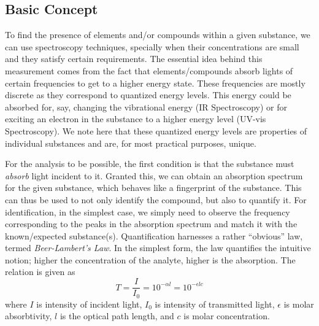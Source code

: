 \subsection {Basic Concept}
To find the presence of elements and/or compounds within a given substance, we can use spectroscopy techniques, specially when their concentrations are small and they satisfy certain requirements. The essential idea behind this measurement comes from the fact that elements/compounds absorb lights of certain frequencies to get to a higher energy state. These frequencies are mostly discrete as they correspond to quantized energy levels. This energy could be absorbed for, say, changing the vibrational energy (IR Spectroscopy) or for exciting an electron in the substance to a higher energy level (UV-vis Spectroscopy). We note here that these quantized energy levels are properties of individual substances and are, for most practical purposes, unique.
\par
For the analysis to be possible, the first condition is that the substance must \emph{absorb} light incident to it.  Granted this, we can obtain an absorption spectrum for the given substance, which behaves like a fingerprint of the substance. This can thus be used to not only identify the compound, but also to quantify it. For identification, in the simplest case, we simply need to observe the frequency corresponding to the peaks in the absorption spectrum and match it with the known/expected substance(s). Quantification harnesses a rather ``obvious'' law, termed \emph{Beer-Lambert's Law}. In the simplest form, the law quantifies the intuitive notion; higher the concentration of the analyte, higher is the absorption. The relation is given as
\begin{equation}
T=\frac{I}{I_{0}}=10^{-\alpha l}=10^{- \epsilon l c}
\label{beerlambertslaw}
\end{equation}
where $I$ is intensity of incident light, $I_{0}$ is intensity of transmitted light, $\epsilon$ is molar absorbtivity, $l$ is the optical path length, and $c$ is molar concentration.


